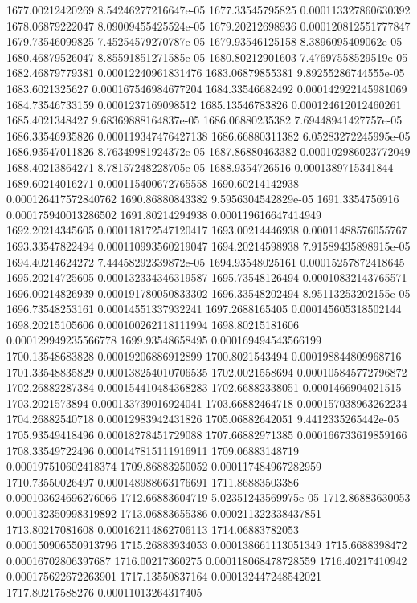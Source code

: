 {1677.00212420269 8.54246277216647e-05
1677.33545795825 0.000113327860630392
1678.06879222047 8.09009455425524e-05
1679.20212698936 0.000120812551777847
1679.73546099825 7.45254579270787e-05
1679.93546125158 8.3896095409062e-05
1680.46879526047 8.85591851271585e-05
1680.80212901603 7.47697558529519e-05
1682.46879779381 0.00012240961831476
1683.06879855381 9.89255286744555e-05
1683.6021325627 0.000167546984677204
1684.33546682492 0.000142922145981069
1684.73546733159 0.0001237169098512
1685.13546783826 0.000124612012460261
1685.4021348427 9.68369888164837e-05
1686.06880235382 7.69448941427757e-05
1686.33546935826 0.000119347476427138
1686.66880311382 6.05283272245995e-05
1686.93547011826 8.76349981924372e-05
1687.86880463382 0.000102986023772049
1688.40213864271 8.78157248228705e-05
1688.9354726516 0.0001389715341844
1689.60214016271 0.000115400672765558
1690.60214142938 0.000126417572840762
1690.86880843382 9.5956304542829e-05
1691.3354756916 0.000175940013286502
1691.80214294938 0.000119616647414949
1692.20214345605 0.000118172547120417
1693.00214446938 0.00011488576055767
1693.33547822494 0.000110993560219047
1694.20214598938 7.91589435898915e-05
1694.40214624272 7.44458292339872e-05
1694.93548025161 0.00015257872418645
1695.20214725605 0.000132334346319587
1695.73548126494 0.00010832143765571
1696.00214826939 0.000191780050833302
1696.33548202494 8.95113253202155e-05
1696.73548253161 0.00014551337932241
1697.2688165405 0.000145605318502144
1698.20215105606 0.000100262118111994
1698.80215181606 0.000129949235566778
1699.93548658495 0.000169494543566199
1700.13548683828 0.00019206886912899
1700.8021543494 0.000198844809968716
1701.33548835829 0.000138254010706535
1702.0021558694 0.000105845772796872
1702.26882287384 0.000154410484368283
1702.66882338051 0.0001466904021515
1703.2021573894 0.000133739016924041
1703.66882464718 0.000157038963262234
1704.26882540718 0.00012983942431826
1705.06882642051 9.4412335265442e-05
1705.93549418496 0.00018278451729088
1707.66882971385 0.000166733619859166
1708.33549722496 0.000147815111916911
1709.06883148719 0.000197510602418374
1709.86883250052 0.000117484967282959
1710.73550026497 0.000148988663176691
1711.86883503386 0.000103624696276066
1712.66883604719 5.02351243569975e-05
1712.86883630053 0.000132350998319892
1713.06883655386 0.000211322338437851
1713.80217081608 0.000162114862706113
1714.06883782053 0.000150906550913796
1715.26883934053 0.000138661113051349
1715.6688398472 0.00016702806397687
1716.00217360275 0.000118068478728559
1716.40217410942 0.000175622672263901
1717.13550837164 0.000132447248542021
1717.80217588276 0.00011013264317405
}
